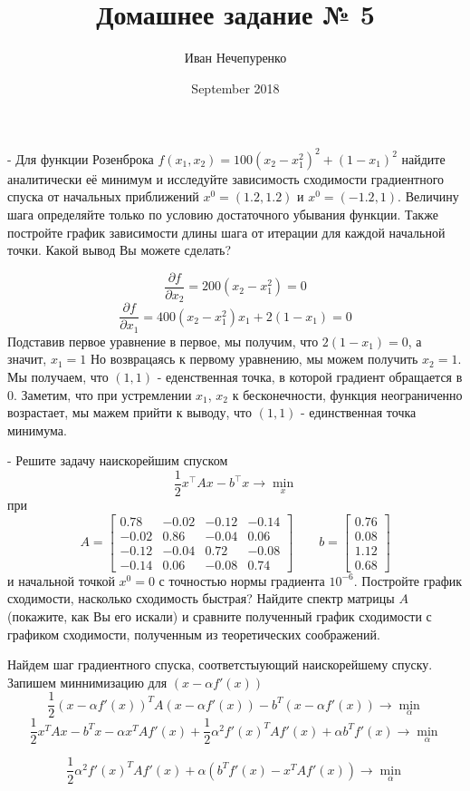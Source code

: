 \documentclass{article}
\title{Домашнее задание № 5}
\author{Иван Нечепуренко }
\date{September 2018}
\begin{document}
- Для функции Розенброка $f(x_1, x_2) = 100 (x_2 - x^2_1)^2 + (1 - x_1)^2$ найдите аналитически её минимум и исследуйте зависимость сходимости градиентного спуска от начальных приближений $x^0 = (1.2, 1.2)$ и $x^0 = (-1.2, 1)$. 
Величину шага определяйте только по условию достаточного убывания функции. 
Также постройте график зависимости длины шага от итерации для каждой начальной точки. Какой вывод Вы можете сделать?


$$ \frac{\partial f}{\partial x_2} = 200(x_2 - x_1^2)  = 0 $$
$$ \frac{\partial f}{\partial x_1} = 400(x_2 - x_1^2)x_1 + 2(1 - x_1) = 0$$
Подставив первое уравнение в первое, мы получим, что $2(1 - x_1) = 0$, а значит, $x_1 = 1$
Но возврацаясь к первому уравнению, мы можем получить $x_2 = 1$. Мы получаем, что $(1, 1)$ - еденственная точка, в которой градиент обращается в $0$. Заметим, что при устремлении $x_1$,
$x_2$ к бесконечности, функция неограниченно возрастает, мы мажем прийти к выводу, что $(1, 1)$ - единственная точка минимума.

- Решите задачу наискорейшим спуском
$$
\frac{1}{2}x^{\top}Ax - b^{\top}x \to \min_x
$$
при 
$$
A = 
\begin{bmatrix}
0.78 & −0.02 & −0.12 & −0.14\\
−0.02 & 0.86 & −0.04 & 0.06 \\
−0.12 & −0.04 & 0.72 & −0.08\\
−0.14 & 0.06 & −0.08 & 0.74
\end{bmatrix}
\qquad
b = \begin{bmatrix}
0.76\\
0.08\\
1.12\\
0.68
\end{bmatrix}
$$
и начальной точкой $x^0 = 0$ с точностью нормы градиента $10^{-6}$. Постройте график сходимости, насколько сходимость быстрая? Найдите спектр матрицы $A$ (покажите, как Вы его искали) и сравните полученный график сходимости с графиком сходимости, полученным из теоретических соображений.

Найдем шаг градиентного спуска,  соответстыующий наискорейшему спуску. Запишем
миннимизацию для $(x - \alpha f'(x))$
$$\frac{1}{2}(x - \alpha f'(x))^TA(x - \alpha f'(x))  - b^T(x - \alpha f'(x)) \to \min_\alpha$$
$$\frac{1}{2} x^TAx - b^Tx  - \alpha x^T  A f'(x) + \frac{1}{2}\alpha^2f'(x)^T A f'(x) + \alpha b^T f'(x)
\to \min_\alpha$$

$$\frac{1}{2}\alpha^2f'(x)^T A f'(x) + \alpha ( b^T f'(x) - x^T  A f'(x))
\to \min_\alpha$$
\end{document}
